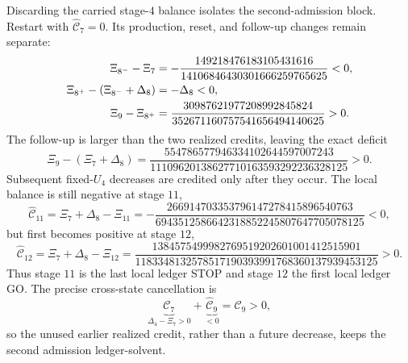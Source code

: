 \begin{proposition}
Discarding the carried stage-$4$ balance isolates the second-admission block.
Restart with $\widehat{\mathcal C}_7=0$.  Its production, reset, and follow-up
changes remain separate:
\begin{align}
 \Xi_{8^-}-\Xi_7
 &=-\frac{149218476183105431616}
 {14106846430301666259765625}<0,
 \notag\\
 \Xi_{8^+}-(\Xi_{8^-}+\Delta_8)&=-\Delta_8<0,
 \notag\\
 \Xi_9-\Xi_{8^+}
 &=\frac{30987621977208992845824}
 {352671160757541656494140625}>0.
 \label{eq:path-delta-squared-phase-split}
\end{align}
The follow-up is larger than the two realized credits, leaving the exact
deficit
\begin{equation*}
 \Xi_9-(\Xi_7+\Delta_8)
 =\frac{554786577946334102644597007243}
 {11109620138627710163593292236328125}>0.
\end{equation*}
Subsequent fixed-$U_4$ decreases are credited only after they occur.  The
local balance is still negative at stage $11$,
\begin{equation}
 \widehat{\mathcal C}_{11}
 =\Xi_7+\Delta_8-\Xi_{11}
 =-\frac{266914703353796147278415896540763}
 {6943512586642318852245807647705078125}<0,
 \label{eq:path-delta-squared-stage-eleven-stop}
\end{equation}
but first becomes positive at stage $12$,
\begin{equation}
 \widehat{\mathcal C}_{12}
 =\Xi_7+\Delta_8-\Xi_{12}
 =\frac{1384575499982769519202601001412515901}
 {1183348132578517190393991768360137939453125}>0.
 \label{eq:path-delta-squared-stage-twelve-go}
\end{equation}
Thus stage $11$ is the last local ledger STOP and stage $12$ the first local
ledger GO.
The precise cross-state cancellation is
\begin{equation}
 \underbrace{\mathcal C_7}_{\Delta_4-\Xi_7>0}
 +\underbrace{\widehat{\mathcal C}_9}_{<0}
 =\mathcal C_9>0,
 \label{eq:path-two-admission-cross-state-cancellation}
\end{equation}
so the unused earlier realized credit, rather than a future decrease, keeps
the second admission ledger-solvent.


\end{proposition}
